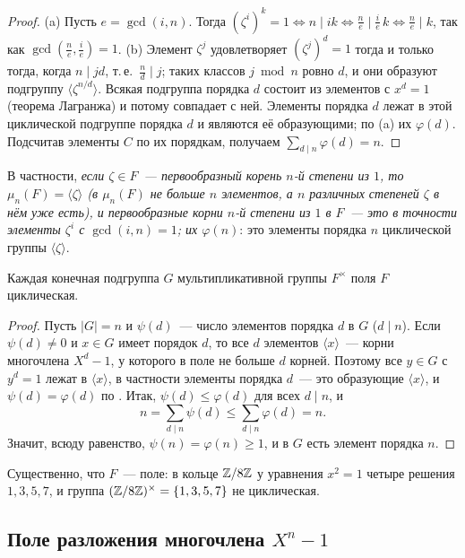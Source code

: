 \begin{proof}
(a) Пусть $e=\gcd(i,n)$. Тогда $(\zeta^i)^k=1\iff n\mid ik\iff\frac ne\mid\frac ie\,k\iff\frac ne\mid k$, так как
$\gcd(\frac ne,\frac ie)=1$. (b) Элемент $\zeta^j$ удовлетворяет $(\zeta^j)^d=1$ тогда и только тогда, когда $n\mid jd$,
т.\,е.\ $\frac nd\mid j$; таких классов $j\bmod n$ ровно $d$, и они образуют подгруппу $\langle\zeta^{n/d}\rangle$. Всякая
подгруппа порядка $d$ состоит из элементов с $x^d=1$ (теорема Лагранжа) и потому совпадает с ней. Элементы порядка $d$
лежат в этой циклической подгруппе порядка $d$ и являются её образующими; по (a) их $\varphi(d)$. Подсчитав элементы $C$
по их порядкам, получаем $\sum_{d\mid n}\varphi(d)=n$.
\end{proof}

В частности, \emph{если $\zeta\in F$~--- первообразный корень $n$-й степени из $1$, то $\mu_n(F)=\langle\zeta\rangle$
(в $\mu_n(F)$ не больше $n$ элементов, а $n$ различных степеней $\zeta$ в нём уже есть), и первообразные корни $n$-й степени
из $1$ в $F$~--- это в точности элементы $\zeta^i$ с $\gcd(i,n)=1$; их $\varphi(n)$}: это элементы порядка $n$ циклической
группы $\langle\zeta\rangle$.

\begin{lemma}[5.7c]
Каждая конечная подгруппа $G$ мультипликативной группы $F^\times$ поля $F$ циклическая.
\end{lemma}

\begin{proof}
Пусть $|G|=n$ и $\psi(d)$~--- число элементов порядка $d$ в $G$ ($d\mid n$). Если $\psi(d)\ne0$ и $x\in G$ имеет порядок
$d$, то все $d$ элементов $\langle x\rangle$~--- корни многочлена $X^d-1$, у которого в поле не больше $d$ корней.
Поэтому все $y\in G$ с $y^d=1$ лежат в $\langle x\rangle$, в частности элементы порядка $d$~--- это образующие
$\langle x\rangle$, и $\psi(d)=\varphi(d)$ по . Итак, $\psi(d)\le\varphi(d)$ для всех $d\mid n$, и
\[
n=\sum_{d\mid n}\psi(d)\le\sum_{d\mid n}\varphi(d)=n .
\]
Значит, всюду равенство, $\psi(n)=\varphi(n)\ge1$, и в $G$ есть элемент порядка $n$.
\end{proof}

Существенно, что $F$~--- поле: в кольце $\mathbb Z/8\mathbb Z$ у уравнения $x^2=1$ четыре решения $1,3,5,7$, и группа
$(\mathbb Z/8\mathbb Z)^\times=\{1,3,5,7\}$ не циклическая.

\subsection*{Поле разложения многочлена $X^n-1$}

